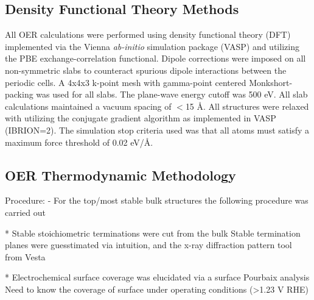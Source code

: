 \subsection{Density Functional Theory Methods}  %
%
%
All OER calculations were performed using density functional theory (DFT) implemented via the Vienna {\it ab-initio} simulation package (VASP)
\cite{Kresse1995,Kresse1996_0,Kresse1996_1}
and utilizing the PBE exchange-correlation functional\cite{Perdew1996}.
%
Dipole corrections were imposed on all non-symmetric slabs to counteract spurious dipole interactions between the periodic cells.\cite{Neugebauer1992}
A 4x4x3 k-point mesh with gamma-point centered Monkshort-packing\cite{Monkhorst1976} was used for all slabs.
%
The plane-wave energy cutoff was 500 eV.
All slab calculations maintained a vacuum spacing of $<$15 \AA.
%
All structures were relaxed with utilizing the conjugate gradient algorithm as implemented in VASP (IBRION=2).
%
The simulation stop criteria used was that all atoms must satisfy a maximum force threshold of 0.02 eV/\AA.



\subsection{OER Thermodynamic Methodology}  %
%
Procedure:
- For the top/most stable bulk structures the following procedure was carried out

* Stable stoichiometric terminations were cut from the bulk Stable termination planes were guesstimated via intuition, and the x-ray diffraction pattern tool from Vesta

* Electrochemical surface coverage was elucidated via a surface Pourbaix analysis Need to know the coverage of surface under operating conditions (>1.23 V RHE)

